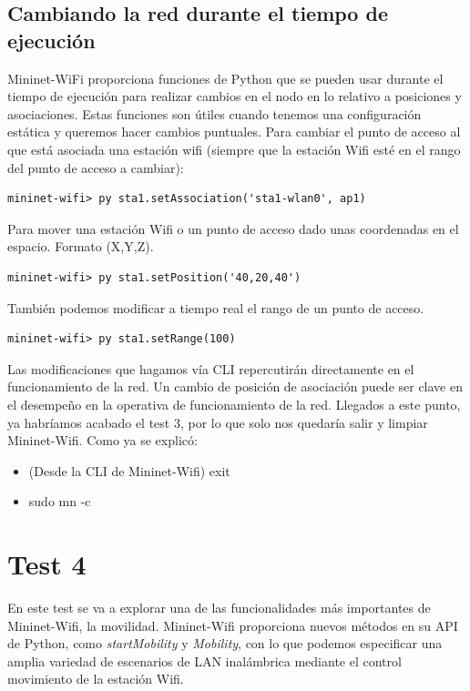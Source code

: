 \subsection{Cambiando la red durante el tiempo de ejecución}

Mininet-WiFi proporciona funciones de Python que se pueden usar durante el tiempo de ejecución para realizar cambios en el nodo en lo relativo a posiciones y asociaciones. Estas funciones son útiles cuando tenemos una configuración estática y queremos hacer cambios puntuales.\newline
\newline
Para cambiar el punto de acceso al que está asociada una estación wifi (siempre que la estación Wifi esté en el rango del punto de acceso a cambiar):
\begin{verbatim}
mininet-wifi> py sta1.setAssociation('sta1-wlan0', ap1)
\end{verbatim}
Para mover una estación Wifi o un punto de acceso dado unas coordenadas en el espacio. Formato (X,Y,Z).
\begin{verbatim}
mininet-wifi> py sta1.setPosition('40,20,40')
\end{verbatim}
También podemos modificar a tiempo real el rango de un punto de acceso.
\begin{verbatim}
mininet-wifi> py sta1.setRange(100)
\end{verbatim}
Las modificaciones que hagamos vía CLI repercutirán directamente en el funcionamiento de la red. Un cambio de posición de asociación puede ser clave en el desempeño en la operativa de funcionamiento de la red.
\newline
\newline
Llegados a este punto, ya habríamos acabado el test 3, por lo que solo nos quedaría salir y limpiar Mininet-Wifi. Como ya se explicó:

\begin{itemize}
    \item (Desde la CLI de Mininet-Wifi) exit
    \item  sudo mn -c
\end{itemize}
\newpage
\section{Test 4}
En este test se va a explorar una de las funcionalidades más importantes de Mininet-Wifi, la movilidad. Mininet-Wifi proporciona nuevos métodos en su API de Python, como \textit{startMobility} y \textit{Mobility}, con lo que podemos especificar una amplia variedad de escenarios de LAN inalámbrica mediante el control
movimiento de la estación Wifi.

